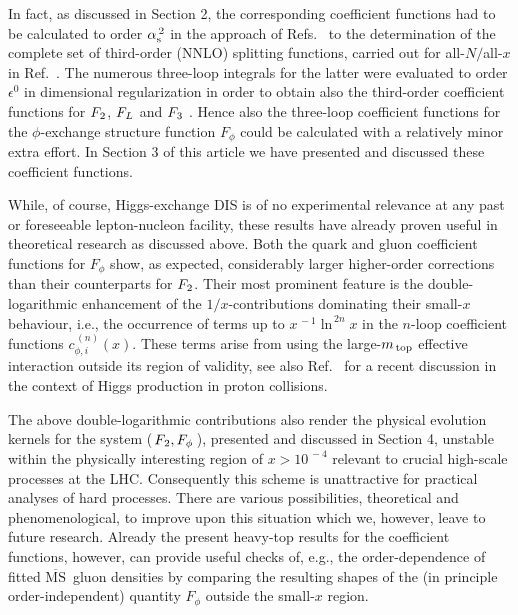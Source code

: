 \documentclass[12pt]{article}
\newcommand{\MSb}{$\overline{\mbox{MS}}$}
\newcommand{\as}{\alpha_{\rm s}}
\newcommand{\ep}{\epsilon}
\begin{document}
In fact, as discussed in Section 2, the corresponding coefficient functions had
to be calculated to order $\as^{\,2}$ in the approach of Refs.~\cite{Mom3loop} 
to the determination of the complete set of third-order (NNLO) splitting 
functions, carried out for all-$N/$all-$x$ in Ref.~\cite{MVV4}. The numerous 
three-loop integrals for the latter were evaluated to order $\ep^{0}$ in 
dimensional regularization in order to obtain also the third-order coefficient 
functions for ${F_{\:\! 2}}$, ${F_{\:\! L}}$ and $\F3$ \cite{MVV5,MVV6,MVV10}. 
Hence also the three-loop coefficient functions for the $\phi$-exchange 
structure function $F_\phi$ could be calculated with a relatively minor extra 
effort. In Section 3 of this article we have presented and discussed these 
coefficient functions.

While, of course, Higgs-exchange DIS is of no experimental relevance at any
past or foreseeable lepton-nucleon facility, these results have already proven
useful in theoretical research as discussed above. Both the quark and gluon
coefficient functions for $F_\phi$ show, as expected, considerably larger 
higher-order corrections than their counterparts for ${F_{\:\! 2}}$. Their most
prominent feature is the double-logarithmic enhancement of the 
$1/x$-contributions dominating their small-$x$ behaviour, i.e., the occurrence
of terms up to $x^{\,-1} \ln^{\,2n} x$ in the $n$-loop coefficient functions
$c_{\phi,i}^{\,(n)}(x)$. These terms arise from using the large-$m_{\,\rm top}$
effective interaction outside its region of validity, see also Ref.~\cite
{Marzani:2008az} for a recent discussion in the context of Higgs production in
proton collisions.

The above double-logarithmic contributions also render the physical evolution
kernels for the system ($\,{F_{\:\! 2}}, F_\phi\,$), presented and discussed in 
Section 4, unstable within the physically interesting region of $x > 10^{\,-4}$
relevant to crucial high-scale processes at the LHC. Consequently this scheme
is unattractive for practical analyses of hard processes. There are various 
possibilities, theoretical and phenomenological, to improve upon this situation
which we, however, leave to future research. 
Already the present heavy-top results for the coefficient functions, however, 
can provide useful checks of, e.g., the order-dependence of fitted \MSb\ gluon 
densities by comparing the resulting shapes of the (in principle 
order-independent) quantity $F_\phi$ outside the small-$x$ region.
\end{document}
